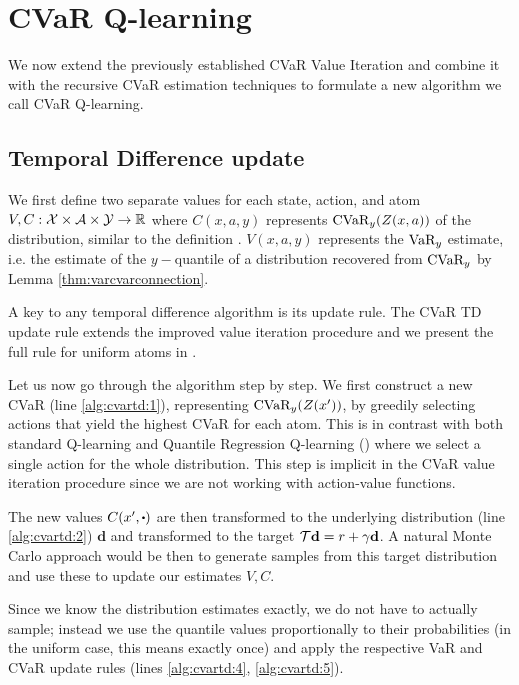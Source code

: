 \section{CVaR Q-learning}\label{sec:qcvar}

We now extend the previously established CVaR Value Iteration and combine it with the recursive CVaR estimation techniques to formulate a new algorithm we call CVaR Q-learning.

\subsection{Temporal Difference update}
We first define two separate values for each state, action, and atom $V, C: \mathcal{X}\times\mathcal{A}\times\mathcal{Y}\to\mathbb{R}$ where $C(x, a, y)$ represents $\text{CVaR}_y(Z(x, a))$ of the distribution, similar to the definition . $V(x, a, y)$ represents the $\text{VaR}_y$ estimate, i.e. the estimate of the $y-$quantile of a distribution recovered from $\text{CVaR}_y$ by Lemma \ref{thm:varcvarconnection}.

A key to any temporal difference algorithm is its update rule. The CVaR TD update rule extends the improved value iteration procedure and we present the full rule for uniform atoms in . 

Let us now go through the algorithm step by step. We first construct a new CVaR (line \ref{alg:cvartd:1}), representing $\text{CVaR}_y(Z(x'))$, by greedily selecting actions that yield the highest CVaR for each atom. This is in contrast with both standard Q-learning and Quantile Regression Q-learning () where we select a single action for the whole distribution.
This step is implicit in the CVaR value iteration procedure since we are not working with action-value functions. 

The new values $C(x', \bigcdot)$ are then transformed to the underlying distribution (line \ref{alg:cvartd:2}) $\mathbf{d}$ and transformed to the target $\mathcal{T} \mathbf{d} = r + \gamma \mathbf{d}$. A natural Monte Carlo approach would be then to generate samples from this target distribution and use these to update our estimates $V, C$.

Since we know the distribution estimates exactly, we do not have to actually sample; instead we use the quantile values proportionally to their probabilities (in the uniform case, this means exactly once) and apply the respective VaR and CVaR update rules (lines \ref{alg:cvartd:4}, \ref{alg:cvartd:5}).


